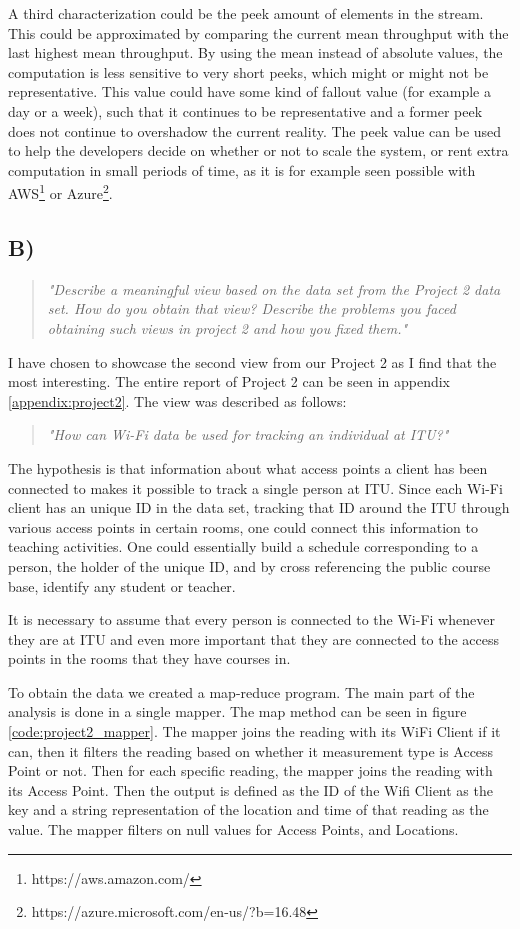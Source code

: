 	\newpar A third characterization could be the peek amount of elements in the stream. This could be approximated by comparing the current mean throughput with the last highest mean throughput. By using the mean instead of absolute values, the computation is less sensitive to very short peeks, which might or might not be representative. This value could have some kind of fallout value (for example a day or a week), such that it continues to be representative and a former peek does not continue to overshadow the current reality. The peek value can be used to help the developers decide on whether or not to scale the system, or rent extra computation in small periods of time, as it is for example seen possible with AWS\footnote{https://aws.amazon.com/} or Azure\footnote{https://azure.microsoft.com/en-us/?b=16.48}.
	
	\subsection{B)}
	\begin{quote}
			\textit{"Describe	a	meaningful	view	based	on	the	data	set	from	the	Project	2	data	set.	How	do	you	obtain	that	view?	Describe	the	problems	you	faced	obtaining	such	views	in	project	2	and	how	you	fixed	them."}
	\end{quote}
	I have chosen to showcase the second view from our Project 2 as I find that the most interesting. The entire report of Project 2 can be seen in appendix \ref{appendix:project2}. The view was described as follows: 
	\begin{quote}
		\textit{"How can Wi-Fi data be used for tracking an individual at ITU?"}
	\end{quote}
	The hypothesis is that information about what access points a client has been connected to makes it possible to track a single person at ITU. Since each Wi-Fi client has an unique ID in the data set, tracking that ID around the ITU through various access points in certain rooms, one could connect this information to teaching activities. One could essentially build a schedule corresponding to a person, the holder of the unique ID, and by cross referencing the public course base, identify any student or teacher. 
	
	It is necessary to assume that every person is connected to the Wi-Fi whenever they are at ITU and even more important that they are connected to the access points in the rooms that they have courses in. 
	
	\newpar To obtain the data we created a map-reduce program. The main part of the analysis is done in a single mapper. The map method can be seen in figure \ref{code:project2_mapper}. The mapper joins the reading with its WiFi Client if it can, then it filters the reading based on whether it measurement type is Access Point or not. Then for each specific reading, the mapper joins the reading with its Access Point. Then the output is defined as the ID of the Wifi Client as the key and a string representation of the location and time of that reading as the value. The mapper filters on null values for Access Points, and Locations.
	
